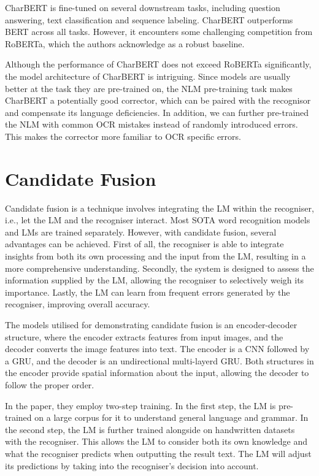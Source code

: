 CharBERT is fine-tuned on several downstream tasks, including question answering, text classification and sequence labeling. CharBERT outperforms BERT across all tasks. However, it encounters some challenging competition from RoBERTa, which the authors acknowledge as a robust baseline. 

Although the performance of CharBERT does not exceed RoBERTa significantly, the model architecture of CharBERT is intriguing. Since models are usually better at the task they are pre-trained on, the NLM pre-training task makes CharBERT a potentially good corrector, which can be paired with the recognisor and compensate its language deficiencies. In addition, we can further pre-trained the NLM with common OCR mistakes instead of randomly introduced errors. This makes the corrector more familiar to OCR specific errors.

\section{Candidate Fusion}
\label{sec:2_candidate_fusion}
Candidate fusion \citep{kang2021candidate} is a technique involves integrating the LM within the recogniser, i.e., let the LM and the recogniser interact. Most SOTA word recognition models and LMs are trained separately. However, with candidate fusion, several advantages can be achieved. First of all, the recogniser is able to integrate insights from both its own processing and the input from the LM, resulting in a more comprehensive understanding. Secondly, the system is designed to assess the information supplied by the LM, allowing the recogniser to selectively weigh its importance. Lastly, the LM can learn from frequent errors generated by the recogniser, improving overall accuracy.

The models utilised for demonstrating candidate fusion is an encoder-decoder structure, where the encoder extracts features from input images, and the decoder converts the image features into text. The encoder is a CNN followed by a GRU, and the decoder is an undirectional multi-layerd GRU. Both structures in the encoder provide spatial information about the input, allowing the decoder to follow the proper order.

In the paper, they employ two-step training. In the first step, the LM is pre-trained on a large corpus for it to understand general language and grammar. In the second step, the LM is further trained alongside on handwritten datasets with the recogniser. This allows the LM to consider both its own knowledge and what the recogniser predicts when outputting the result text. The LM will adjust its predictions by taking into the recogniser's decision into account.

